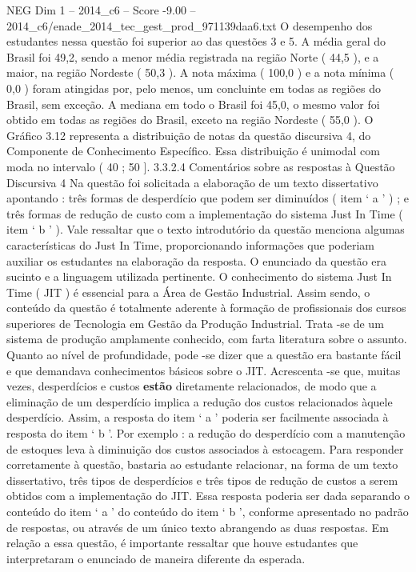 \begin{textsample}{NEG Dim 1 – 2014\_c6 – Score -9.00 – 2014\_c6/enade\_2014\_tec\_gest\_prod\_971139daa6.txt}
O desempenho dos estudantes nessa questão foi superior ao das questões 3 e 5.
A média geral do Brasil foi 49,2, sendo a menor média registrada na região Norte ( 44,5 ), e a maior, na região Nordeste ( 50,3 ).
A nota máxima ( 100,0 ) e a nota mínima ( 0,0 ) foram atingidas por, pelo menos, um concluinte em todas as regiões do Brasil, sem exceção.
A mediana em todo o Brasil foi 45,0, o mesmo valor foi obtido em todas as regiões do Brasil, exceto na região Nordeste ( 55,0 ).
O Gráfico 3.12 representa a distribuição de notas da questão discursiva 4, do Componente de Conhecimento Específico.
Essa distribuição é unimodal com moda no intervalo ( 40 ; 50 ]. 3.3.2.4 Comentários sobre as respostas à Questão Discursiva 4 Na questão foi solicitada a elaboração de um texto dissertativo apontando : três formas de desperdício que podem ser diminuídos ( item ‘ a ’ ) ; e três formas de redução de custo com a implementação do sistema Just In Time ( item ‘ b ’ ).
Vale ressaltar que o texto introdutório da questão menciona algumas características do Just In Time, proporcionando informações que poderiam auxiliar os estudantes na elaboração da resposta.
O enunciado da questão era sucinto e a linguagem utilizada pertinente.
O conhecimento do sistema Just In Time ( JIT ) é essencial para a Área de Gestão Industrial.
Assim sendo, o conteúdo da questão é totalmente aderente à formação de profissionais dos cursos superiores de Tecnologia em Gestão da Produção Industrial.
Trata -se de um sistema de produção amplamente conhecido, com farta literatura sobre o assunto.
Quanto ao nível de profundidade, pode -se dizer que a questão era bastante fácil e que demandava conhecimentos básicos sobre o JIT.
Acrescenta -se que, muitas vezes, desperdícios e custos \textbf{estão} diretamente relacionados, de modo que a eliminação de um desperdício implica a redução dos custos relacionados àquele desperdício.
Assim, a resposta do item ‘ a ’ poderia ser facilmente associada à resposta do item ‘ b ’.
Por exemplo : a redução do desperdício com a manutenção de estoques leva à diminuição dos custos associados à estocagem.
Para responder corretamente à questão, bastaria ao estudante relacionar, na forma de um texto dissertativo, três tipos de desperdícios e três tipos de redução de custos a serem obtidos com a implementação do JIT.
Essa resposta poderia ser dada separando o conteúdo do item ‘ a ’ do conteúdo do item ‘ b ’, conforme apresentado no padrão de respostas, ou através de um único texto abrangendo as duas respostas.
Em relação a essa questão, é importante ressaltar que houve estudantes que interpretaram o enunciado de maneira diferente da esperada.

\end{textsample}
